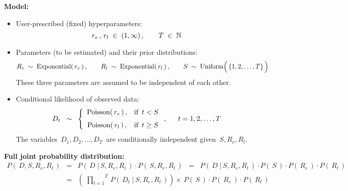 \vskip 0.5cm
\noindent
\textbf{Model:}
\begin{itemize}
\item
	User-prescribed (fixed) hyperparameters:
	\begin{equation*}
	r_{e}\,,\, r_{l} \; \in \; (1,\infty)\,,
	\quad\quad
	T \; \in \; \mathbb{N}
	\end{equation*}
\item
	Parameters (to be estimated) and their prior distributions:
	\begin{equation*}
	R_{e} \;\sim\; \textnormal{Exponential}(\,r_{e}\,)\,,
	\quad\quad
	R_{l} \;\sim\; \textnormal{Exponential}(\,r_{l}\,)\,,
	\quad\quad
	S \;\sim\; \textnormal{Uniform}\!\left(\,\{\overset{{\color{white}.}}{1},2,\ldots,T\}\,\right)
	\end{equation*}
	These three parameters are assumed to be independent of each other.
\item
	Conditional likelihood of observed data:
	\begin{equation*}
	D_{t}
	\;\; \sim \;\;
		\left\{\begin{array}{ccc}
		\textnormal{Poisson}(\,r_{e}\,)\,, & \textnormal{if \,$t < S$}
		\\
		\overset{{\color{white}1}}{\textnormal{Poisson}(\,r_{l}\,)}\,, & \textnormal{if \,$t \geq S$}
		\end{array}\right.,
	\quad\;\;
	t = 1, 2, \ldots, T
	\end{equation*}
	The variables \,$D_{1}, D_{2}, \ldots, D_{T}$\, are conditionally independent given \,$S,R_{e},R_{l}$.
\end{itemize}


\vskip 0.5cm
\noindent
\textbf{Full joint probability distribution:}
\begin{eqnarray*}
P\!\left(\,D,S,R_{e},R_{l}\,\right)
& = &
	P\!\left(\,D \;\vert\, S,R_{e},R_{l}\,\right)
	\cdot
	P\!\left(\,S,R_{e},R_{l}\,\right)
\;\; = \;\;
	P\!\left(\,D \;\vert\, S,R_{e},R_{l}\,\right)
	\cdot
	P\!\left(\,S\,\right)
	\cdot
	P\!\left(\,R_{e}\,\right)
	\cdot
	P\!\left(\,R_{l}\,\right)
\\
& = &
	\left(\;
		\overset{T}{\underset{t=1}{\prod}}\,
		P\!\left(\,D_{t} \;\vert\, S,R_{e},R_{l}\,\right)
		\right)
	\times\,
	P\!\left(\,S\,\right)
	\cdot
	P\!\left(\,R_{e}\,\right)
	\cdot
	P\!\left(\,R_{l}\,\right)
\end{eqnarray*}


